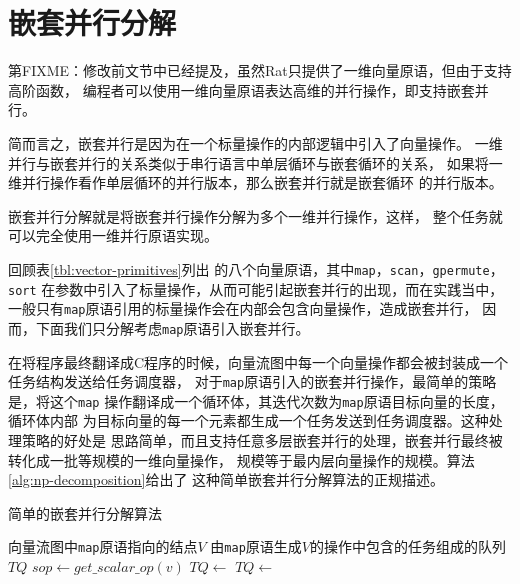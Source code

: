 \section{嵌套并行分解}\label{sec:np-decomposition}
第FIXME：修改前文节中已经提及，虽然Rat只提供了一维向量原语，但由于支持高阶函数，
编程者可以使用一维向量原语表达高维的并行操作，即支持嵌套并行。

简而言之，嵌套并行是因为在一个标量操作的内部逻辑中引入了向量操作。
一维并行与嵌套并行的关系类似于串行语言中单层循环与嵌套循环的关系，
如果将一维并行操作看作单层循环的并行版本，那么嵌套并行就是嵌套循环
的并行版本。
\begin{quotation}
\end{quotation}

嵌套并行分解就是将嵌套并行操作分解为多个一维并行操作，这样，
整个任务就可以完全使用一维并行原语实现。

回顾表\ref{tbl:vector-primitives}列出
的八个向量原语，其中\texttt{map}，\texttt{scan}，\texttt{gpermute}，\texttt{sort}
在参数中引入了标量操作，从而可能引起嵌套并行的出现，而在实践当中，
一般只有\texttt{map}原语引用的标量操作会在内部会包含向量操作，造成嵌套并行，
因而，下面我们只分解考虑\texttt{map}原语引入嵌套并行。

在将程序最终翻译成C程序的时候，向量流图中每一个向量操作都会被封装成一个任务结构发送给任务调度器，
对于\texttt{map}原语引入的嵌套并行操作，最简单的策略是，将这个\texttt{map}
操作翻译成一个循环体，其迭代次数为\texttt{map}原语目标向量的长度，循环体内部
为目标向量的每一个元素都生成一个任务发送到任务调度器。这种处理策略的好处是
思路简单，而且支持任意多层嵌套并行的处理，嵌套并行最终被转化成一批等规模的一维向量操作，
规模等于最内层向量操作的规模。算法\ref{alg:np-decomposition}给出了
这种简单嵌套并行分解算法的正规描述。
\begin{algorithm}
  \caption{简单的嵌套并行分解算法}
  \label{alg:np-decomposition}
  \begin{algorithmic}[1]
    \Require 向量流图中\texttt{map}原语指向的结点$V$
    \Ensure 由\texttt{map}原语生成$V$的操作中包含的任务组成的队列$TQ$
    \State $sop \leftarrow get\_scalar\_op(v)$
    \State $TQ \leftarrow$ 
    \EndFor
    \Else
    \State $TQ \leftarrow$ 
    \EndIf
    \State {}
    \EndFunction
  \end{algorithmic}
\end{algorithm}

